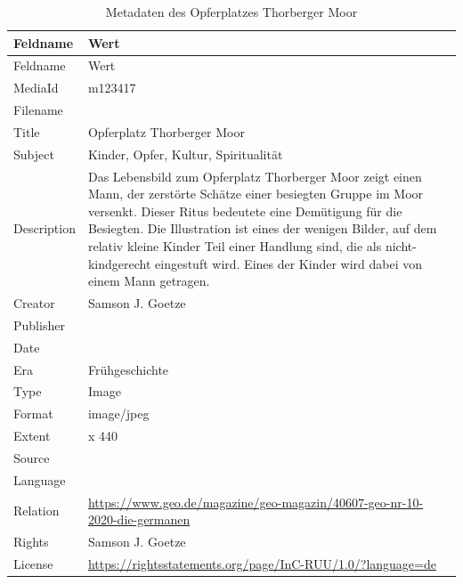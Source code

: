 \documentclass[
  letterpaper,
  DIV=11,
  numbers=noendperiod]{scrartcl}
\begin{document}
\begin{longtable}[]{@{}
  >{\raggedright\arraybackslash}p{}
  >{\raggedright\arraybackslash}p{}@{}}
\caption{Metadaten des Opferplatzes Thorberger
Moor}\label{tbl-metadaten-opferplatz-thorberger-moor}\tabularnewline
\toprule\noalign{}
\begin{minipage}[b]{\linewidth}\raggedright
Feldname
\end{minipage} & \begin{minipage}[b]{\linewidth}\raggedright
Wert
\end{minipage} \\
\midrule\noalign{}
\endfirsthead
\toprule\noalign{}
\begin{minipage}[b]{\linewidth}\raggedright
Feldname
\end{minipage} & \begin{minipage}[b]{\linewidth}\raggedright
Wert
\end{minipage} \\
\midrule\noalign{}
\endhead
\bottomrule\noalign{}
\endlastfoot
MediaId & m123417 \\
Filename & \\
Title & Opferplatz Thorberger Moor \\
Subject & Kinder, Opfer, Kultur, Spiritualität \\
Description & Das Lebensbild zum Opferplatz Thorberger Moor zeigt einen
Mann, der zerstörte Schätze einer besiegten Gruppe im Moor versenkt.
Dieser Ritus bedeutete eine Demütigung für die Besiegten. Die
Illustration ist eines der wenigen Bilder, auf dem relativ kleine Kinder
Teil einer Handlung sind, die als nicht-kindgerecht eingestuft wird.
Eines der Kinder wird dabei von einem Mann getragen. \\
Creator & Samson J. Goetze \\
Publisher & \\
Date & 2020 \\
Era & Frühgeschichte \\
Type & Image \\
Format & image/jpeg \\
Extent & 996 x 440 \\
Source & \\
Language & \\
Relation &
\url{https://www.geo.de/magazine/geo-magazin/40607-geo-nr-10-2020-die-germanen} \\
Rights & Samson J. Goetze \\
License &
\url{https://rightsstatements.org/page/InC-RUU/1.0/?language=de} \\
\end{longtable}
\end{document}
